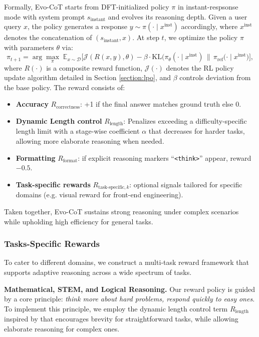Formally, Evo-CoT starts from DFT-initialized policy $\pi$ in instant-respsonse mode with system prompt $s_{\text{instant}}$ and evolves its reasoning depth. Given a user query $x$, the policy generates a response $y \sim \pi(\cdot \mid x^{\text{inst}})$ accordingly, where $x^{\text{inst}}$ denotes the concatenation of $(s_{\text{instant}},x)$.
At step $t$, we optimize the policy $\pi$  with parameters $\theta$ via: 
$$\pi_{t+1} = \arg\max_{\pi} \; \mathbb{E}_{x \sim \mathcal{D}} \big[ \mathcal{J}(R(x,y), \theta) - \beta \cdot \mathrm{KL}\big(\pi_\theta(\cdot \mid x^{\text{inst}}) \,\big\|\, \pi_{\text{ref}}(\cdot \mid x^{\text{inst}}\big) \big],$$ 
where $R(\cdot)$ is a composite reward function, $\mathcal{J(\cdot)}$ denotes the RL policy update algorithm detailed in Section \ref{section:lpo}, and $\beta$ controls deviation from the base policy.
The reward consists of:
\begin{itemize}
    \item \textbf{Accuracy} $R_{\text{correctness}}$: +1 if the final answer matches ground truth else 0.
    \item \textbf{Dynamic Length control} $R_{\text{length}}$:  Penalizes exceeding a difficulty-specific length limit with a stage-wise coefficient $\alpha$ that decreases for harder tasks, allowing more elaborate reasoning when needed. 
    \item \textbf{Formatting} $R_{\text{format}}$: if explicit reasoning markers ``\texttt{<think>}'' appear, reward $-0.5$.
    \item \textbf{Task-specific rewards} $R_{\text{task-specific},k}$: optional signals tailored for specific domains (e.g. visual reward for front-end engineering).
\end{itemize}
Taken together, Evo-CoT sustains strong reasoning under complex scenarios while upholding high efficiency for general tasks.

\subsubsection{Tasks-Specific Rewards}
To cater to different domains, we construct a multi‑task reward framework that supports adaptive reasoning across a wide spectrum of tasks.

\textbf{Mathematical, STEM, and Logical Reasoning.}  
Our reward policy is guided by a core principle: \emph{think more about hard problems, respond quickly to easy ones}.  
To implement this principle, we employ the dynamic length control term $R_{\text{length}}$ inspired by \cite{team2025kimi} that encourages brevity for straightforward tasks, while allowing elaborate reasoning for complex ones.  

